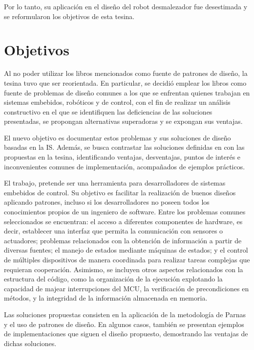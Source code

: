 Por lo tanto, su aplicación en el diseño del robot desmalezador fue desestimada y se reformularon los objetivos de esta tesina.

\section*{Objetivos}

Al no poder utilizar los libros mencionados como fuente de patrones de diseño, la tesina tuvo que ser reorientada. En particular, se decidió emplear los libros como fuente de problemas de diseño comunes a los que se enfrentan quienes trabajan en sistemas embebidos, robóticos y de control, con el fin de realizar un análisis constructivo en el que se identifiquen las deficiencias de las soluciones presentadas, se propongan alternativas superadoras y se expongan sus ventajas.

El nuevo objetivo es documentar estos problemas y sus soluciones de diseño basadas en la \gls{IS}. Además, se busca contrastar las soluciones definidas en \cite{douglass} con las propuestas en la tesina, identificando ventajas, desventajas, puntos de interés e inconvenientes comunes de implementación, acompañados de ejemplos prácticos.

El trabajo, pretende ser una herramienta para desarrolladores de sistemas embebidos de control. Su objetivo es facilitar la realización de buenos diseños aplicando patrones, incluso si los desarrolladores no poseen todos los conocimientos propios de un ingeniero de software. Entre los problemas comunes seleccionados se encuentran: el acceso a diferentes componentes de hardware, es decir, establecer una interfaz que permita la comunicación con sensores o actuadores; problemas relacionados con la obtención de información a partir de diversas fuentes; el manejo de estados mediante máquinas de estados; y el control de múltiples dispositivos de manera coordinada para realizar tareas complejas que requieran cooperación. Asimismo, se incluyen otros aspectos relacionados con la estructura del código, como la organización de la ejecución explotando la capacidad de majear interrupciones del \gls{MCU}, la verificación de precondiciones en métodos, y la integridad de la información almacenada en memoria.

Las soluciones propuestas consisten en la aplicación de la metodología de Parnas \cite{Parnas1972} y el uso de patrones de diseño. En algunos casos, también se presentan ejemplos de implementaciones que siguen el diseño propuesto, demostrando las ventajas de dichas soluciones.

